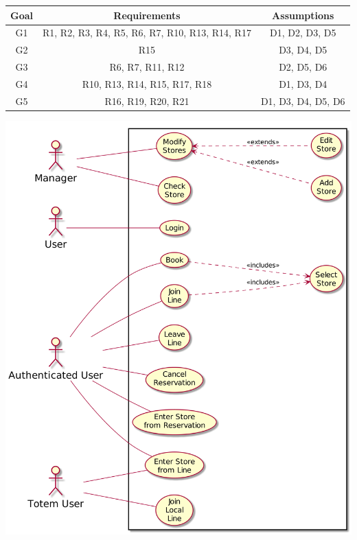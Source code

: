 \begin{center}
    \begin{tabular}{ |c||c|c| }
        \hline
        \textbf{Goal} & \textbf{Requirements} & \textbf{Assumptions} \\
        \hline
        G1 & R1, R2, R3, R4, R5, R6, R7, R10, R13, R14, R17 & D1, D2, D3, D5 \\ %
        \hline
        G2 & R15 & D3, D4, D5 \\ %
        \hline
        G3 & R6, R7, R11, R12 & D2, D5, D6\\ %
        \hline
        G4 & R10, R13, R14, R15, R17, R18 & D1, D3, D4 \\ %
        \hline
        G5 & R16, R19, R20, R21 & D1, D3, D4, D5, D6 \\ %
        \hline
    \end{tabular}
\end{center}

\begin{center}
    \includegraphics[width=\textwidth]{uml/usecase.png}
\end{center}


